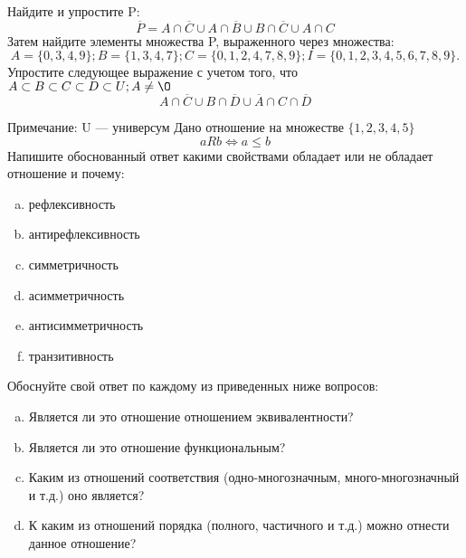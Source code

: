 \documentclass[10pt]{exam}
\begin{document}
\begin{questions}
\question
Найдите и упростите P:
\begin{equation*}
\overline{P} = A \cap \overline{C} \cup A \cap \overline{B} \cup B \cap \overline{C} \cup A \cap C
\end{equation*}
Затем найдите элементы множества P, выраженного через множества:
\begin{equation*}
A = \{0, 3, 4, 9\}; 
B = \{1, 3, 4, 7\};
C = \{0, 1, 2, 4, 7, 8, 9\};
I = \{0, 1, 2, 3, 4, 5, 6, 7, 8, 9\}.
\end{equation*}\question
Упростите следующее выражение с учетом того, что $A\subset B \subset C \subset D \subset U; A \neq \O$
\begin{equation*}
A \cap  \overline{C} \cup B \cap \overline{D} \cup  \overline{A} \cap C \cap  \overline{D}
\end{equation*}

Примечание: U — универсум\question
Дано отношение на множестве $\{1, 2, 3, 4, 5\}$ 
\begin{equation*}
aRb \iff a \leq b
\end{equation*}
Напишите обоснованный ответ какими свойствами обладает или не обладает отношение и почему:   
\begin{enumerate} [a)]\setcounter{enumi}{0}
\item рефлексивность
\item антирефлексивность
\item симметричность
\item асимметричность
\item антисимметричность
\item транзитивность
\end{enumerate}

Обоснуйте свой ответ по каждому из приведенных ниже вопросов:
\begin{enumerate} [a)]\setcounter{enumi}{0}
    \item Является ли это отношение отношением эквивалентности?
    \item Является ли это отношение функциональным?
    \item Каким из отношений соответствия (одно-многозначным, много-многозначный и т.д.) оно является?
    \item К каким из отношений порядка (полного, частичного и т.д.) можно отнести данное отношение?
\end{enumerate}



\end{questions}
\end{document}
